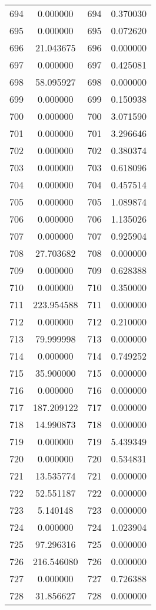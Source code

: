 \documentclass[12pt]{article}
\begin{document}
\begin{longtable}{@{}cccc@{}}
694 & 0.000000 & 694 & 0.370030 \\
695 & 0.000000 & 695 & 0.072620 \\
696 & 21.043675 & 696 & 0.000000 \\
697 & 0.000000 & 697 & 0.425081 \\
698 & 58.095927 & 698 & 0.000000 \\
699 & 0.000000 & 699 & 0.150938 \\
700 & 0.000000 & 700 & 3.071590 \\
701 & 0.000000 & 701 & 3.296646 \\
702 & 0.000000 & 702 & 0.380374 \\
703 & 0.000000 & 703 & 0.618096 \\
704 & 0.000000 & 704 & 0.457514 \\
705 & 0.000000 & 705 & 1.089874 \\
706 & 0.000000 & 706 & 1.135026 \\
707 & 0.000000 & 707 & 0.925904 \\
708 & 27.703682 & 708 & 0.000000 \\
709 & 0.000000 & 709 & 0.628388 \\
710 & 0.000000 & 710 & 0.350000 \\
711 & 223.954588 & 711 & 0.000000 \\
712 & 0.000000 & 712 & 0.210000 \\
713 & 79.999998 & 713 & 0.000000 \\
714 & 0.000000 & 714 & 0.749252 \\
715 & 35.900000 & 715 & 0.000000 \\
716 & 0.000000 & 716 & 0.000000 \\
717 & 187.209122 & 717 & 0.000000 \\
718 & 14.990873 & 718 & 0.000000 \\
719 & 0.000000 & 719 & 5.439349 \\
720 & 0.000000 & 720 & 0.534831 \\
721 & 13.535774 & 721 & 0.000000 \\
722 & 52.551187 & 722 & 0.000000 \\
723 & 5.140148 & 723 & 0.000000 \\
724 & 0.000000 & 724 & 1.023904 \\
725 & 97.296316 & 725 & 0.000000 \\
726 & 216.546080 & 726 & 0.000000 \\
727 & 0.000000 & 727 & 0.726388 \\
728 & 31.856627 & 728 & 0.000000 \\

\end{longtable}
\end{document}
